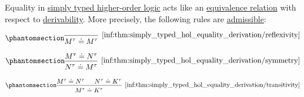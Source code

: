 \begin{proposition}\label{thm:simply_typed_hol_equality_derivation}
  Equality in \hyperref[def:simply_typed_hol]{simply typed higher-order logic} acts like an \hyperref[def:equivalence_relation]{equivalence relation} with respect to \hyperref[def:simply_typed_hol_proof_tree]{derivability}. More precisely, the following rules are \hyperref[con:inference_rule_admissibility]{admissible}:

  \begin{paracol}{3}
    \begin{nthcolumn}{0}
      \ParacolAlignmentHack
      \begin{equation*}\taglabel[\ensuremath{ \logic{HOL}_{=R} }]{inf:thm:simply_typed_hol_equality_derivation/reflexivity}
        \begin{prooftree}
          \infer0[\ref{inf:thm:simply_typed_hol_equality_derivation/reflexivity}]{ M^\tau \syneq M^\tau }.
        \end{prooftree}
      \end{equation*}
    \end{nthcolumn}

    \begin{nthcolumn}{1}
      \ParacolAlignmentHack
      \begin{equation*}\taglabel[\ensuremath{ \logic{HOL}_{=S} }]{inf:thm:simply_typed_hol_equality_derivation/symmetry}
        \begin{prooftree}
          \hypo{ M^\tau \syneq N^\tau }
          \infer1[\ref{inf:thm:simply_typed_hol_equality_derivation/symmetry}]{ N^\tau \syneq M^\tau }.
        \end{prooftree}
      \end{equation*}
    \end{nthcolumn}

    \begin{nthcolumn}{2}
      \ParacolAlignmentHack
      \begin{equation*}\taglabel[\ensuremath{ \logic{HOL}_{=T} }]{inf:thm:simply_typed_hol_equality_derivation/transitivity}
        \begin{prooftree}
          \hypo{ M^\tau \syneq N^\tau }
          \hypo{ N^\tau \syneq K^\tau }
          \infer2[\ref{inf:thm:simply_typed_hol_equality_derivation/transitivity}]{ M^\tau \syneq K^\tau }.
        \end{prooftree}
      \end{equation*}
    \end{nthcolumn}
  \end{paracol}
\end{proposition}
